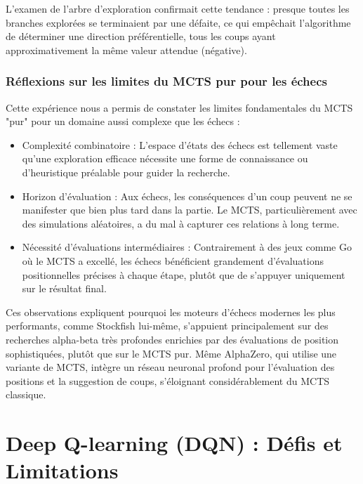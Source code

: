\documentclass{article}
\begin{document}
    L'examen de l'arbre d'exploration confirmait cette tendance : presque toutes les branches explorées se terminaient par une défaite, ce qui empêchait l'algorithme de déterminer une direction préférentielle, tous les coups ayant approximativement la même valeur attendue (négative).\\

    \subsubsection{Réflexions sur les limites du MCTS pur pour les échecs}

    \quad Cette expérience nous a permis de constater les limites fondamentales du MCTS "pur" pour un domaine aussi complexe que les échecs :
    \begin{itemize} 
        \item Complexité combinatoire : L'espace d'états des échecs est tellement vaste qu'une exploration efficace nécessite une forme de connaissance ou d'heuristique préalable pour guider la recherche.
        \item Horizon d'évaluation : Aux échecs, les conséquences d'un coup peuvent ne se manifester que bien plus tard dans la partie. Le MCTS, particulièrement avec des simulations aléatoires, a du mal à capturer ces relations à long terme.
        \item Nécessité d'évaluations intermédiaires : Contrairement à des jeux comme Go où le MCTS a excellé, les échecs bénéficient grandement d'évaluations positionnelles précises à chaque étape, plutôt que de s'appuyer uniquement sur le résultat final.
    \end{itemize}

    Ces observations expliquent pourquoi les moteurs d'échecs modernes les plus performants, comme Stockfish lui-même, s'appuient principalement sur des recherches alpha-beta très profondes enrichies par des évaluations de position sophistiquées, plutôt que sur le MCTS pur. Même AlphaZero, qui utilise une variante de MCTS, intègre un réseau neuronal profond pour l'évaluation des positions et la suggestion de coups, s'éloignant considérablement du MCTS classique.\\

\clearpage

\section{Deep Q-learning (DQN) : Défis et Limitations}
\end{document}
